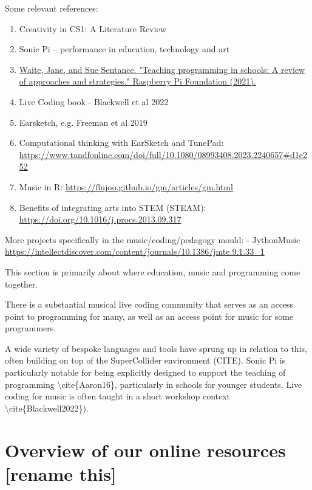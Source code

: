 Some relevant references:
\begin{enumerate}
\item Creativity in CS1: A Literature Review \cite{Sharmin2021}
\item Sonic Pi – performance in education, technology and art \cite{Aaron2016}
\item \href{https://www.raspberrypi.org/app/uploads/2021/11/Teaching-programming-in-schools-pedagogy-review-Raspberry-Pi-Foundation.pdf}{Waite, Jane, and Sue Sentance. "Teaching programming in schools: A review of approaches and strategies." Raspberry Pi Foundation (2021).}
\item Live Coding book - Blackwell et al 2022
\item Earsketch, e.g. Freeman et al 2019
\item Computational thinking with EarSketch and TunePad: \url{https://www.tandfonline.com/doi/full/10.1080/08993408.2023.2240657#d1e252}
\item Music in R: \href{https://flujoo.github.io/gm/articles/gm.html}{https://flujoo.github.io/gm/articles/gm.html}
\item Benefits of integrating arts into STEM (STEAM): \href{https://doi.org/10.1016/j.procs.2013.09.317}{https://doi.org/10.1016/j.procs.2013.09.317}
\end{enumerate}

More projects specifically in the music/coding/pedagogy mould:
 - JythonMusic \url{https://intellectdiscover.com/content/journals/10.1386/jmte.9.1.33_1}

 This section is primarily about where education, music and programming come together.


 There is a substantial musical live coding community that serves as an access point to programming for many, as well as an access point for music for some programmers.


A wide variety of bespoke languages and tools have sprung up in relation to this, often building on top of the SuperCollider environment (CITE). Sonic Pi is particularly notable for being explicitly designed to support the teaching of programming \textbackslash{}cite\{Aaron16\}, particularly in schools for younger students. Live coding for music is often taught in a short workshop context \textbackslash{}cite\{Blackwell2022\}).



\section{Overview of our online resources [rename this]} \label{sec:resources}

